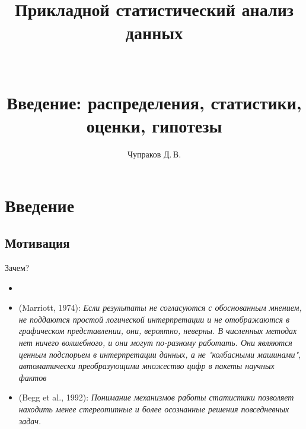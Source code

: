 \documentclass[11pt,pdf,utf8,hyperref={unicode},aspectratio=169]{beamer}
\title{Прикладной статистический анализ данных\\~\\~\\\large{Введение: распределения, статистики, оценки, гипотезы}}
\author{Чупраков Д.\,В.}
\date{}
\begin{document}
\begin{frame}
    \titlepage
\end{frame}

\section{Введение}
\subsection{Мотивация}
\begin{frame}{Зачем?}
		\begin{itemize}
			\item {}
            \pause
			\item {}
            \begin{adjustwidth}{0.5cm}{}
			\normalsize (Marriott, 1974):
			\textit{
                Если результаты не согласуются с обоснованным мнением, не поддаются простой логической интерпретации и не отображаются в графическом представлении, они, вероятно, неверны.
                В численных методах нет ничего волшебного, и они могут по-разному работать. Они являются ценным подспорьем в интерпретации данных, а не "колбасными машинами", автоматически преобразующими множество цифр в пакеты научных фактов
        }
		\end{adjustwidth}
            \pause
			\item {}
		\begin{adjustwidth}{0.5cm}{} \normalsize (Begg et al., 1992):
		\textit{ Понимание механизмов работы статистики позволяет находить менее стереотипные и более осознанные решения повседневных задач.}
		\end{adjustwidth}
		\end{itemize}
\end{frame}
\end{document}

